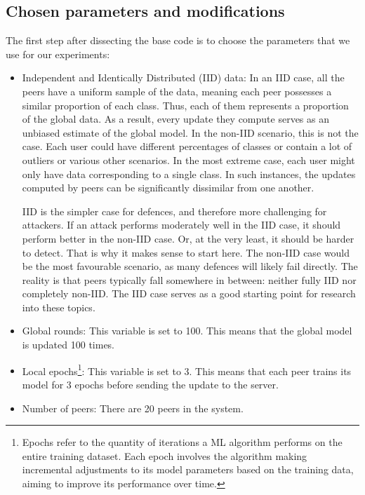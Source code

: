\subsection{Chosen parameters and modifications}\label{sec:chosen_parameters}
The first step after dissecting the base code \cite{LFighter_code} is to choose the parameters that we use for our experiments:
\begin{itemize}
        \item Independent and Identically Distributed (IID) data: In an IID case, all the peers have a uniform sample of the data, meaning each peer possesses a similar proportion of each class. Thus, each of them represents a proportion of the global data. As a result, every update they compute serves as an unbiased estimate of the global model. In the non-IID scenario, this is not the case. Each user could have different percentages of classes or contain a lot of outliers or various other scenarios. In the most extreme case, each user might only have data corresponding to a single class. In such instances, the updates computed by peers can be significantly dissimilar from one another. 
        
        IID is the simpler case for defences, and therefore more challenging for attackers. If an attack performs moderately well in the IID case, it should perform better in the non-IID case. Or, at the very least, it should be harder to detect. That is why it makes sense to start here. The non-IID case would be the most favourable scenario, as many defences will likely fail directly. The reality is that peers typically fall somewhere in between: neither fully IID nor completely non-IID. The IID case serves as a good starting point for research into these topics.
        \item Global rounds: This variable is set to 100. This means that the global model is updated 100 times.
        \item Local epochs\footnote{Epochs refer to the quantity of iterations a ML algorithm performs on the entire training dataset. Each epoch involves the algorithm making incremental adjustments to its model parameters based on the training data, aiming to improve its performance over time.}: This variable is set to 3. This means that each peer trains its model for 3 epochs before sending the update to the server.
        \item Number of peers: There are 20 peers in the system. 
\end{itemize}

